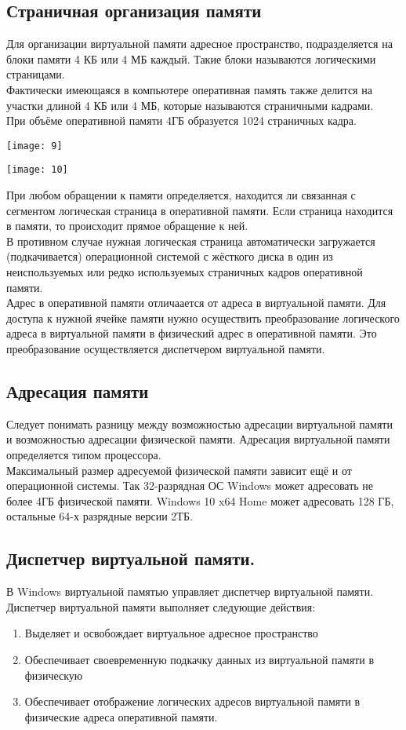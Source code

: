 \documentclass[a4paper]{article}
\begin{document}
\subsection{Страничная организация памяти}
Для организации виртуальной памяти адресное пространство, подразделяется на блоки памяти 4 КБ или 4 МБ каждый. Такие блоки называются логическими страницами.\\
Фактически имеющаяся в компьютере оперативная память также делится на участки длиной 4 КБ или 4 МБ, которые называются страничными кадрами.\\
При объёме оперативной памяти 4ГБ образуется 1024 страничных кадра.\\
\begin{center}
        \texttt{[image: 9]}
\end{center}
\begin{center}
        \texttt{[image: 10]}
\end{center}
При любом обращении к памяти определяется, находится ли связанная с сегментом логическая страница в оперативной памяти. Если страница находится в памяти, то происходит прямое обращение к ней.\\
В противном случае нужная логическая страница автоматически загружается (подкачивается) операционной системой с жёсткого диска в один из неиспользуемых или редко используемых страничных кадров оперативной памяти.\\
Адрес в оперативной памяти отличаается от адреса в виртуальной памяти. Для доступа к нужной ячейке памяти нужно осуществить преобразование логического адреса в виртуальной памяти в физический адрес в оперативной памяти. Это преобразование осуществляется диспетчером виртуальной памяти.\\
\subsection{Адресация памяти}
Следует понимать разницу между возможностью адресации виртуальной памяти и возможностью адресации физической памяти. Адресация виртуальной памяти определяется типом процессора.\\
Максимальный размер адресуемой физической памяти зависит ещё и от операционной системы. Так 32-разрядная ОС Windows может адресовать не более 4ГБ физической памяти. Windows 10 x64 Home может адресовать 128 ГБ, остальные 64-х разрядные версии 2ТБ.
\subsection{Диспетчер виртуальной памяти.}
В Windows виртуальной памятью управляет диспетчер виртуальной памяти. Диспетчер виртуальной памяти выполняет следующие действия:
\begin{enumerate}
	\item Выделяет и освобождает виртуальное адресное пространство
        \item Обеспечивает своевременную подкачку данных из виртуальной памяти в физическую
	\item Обеспечивает отображение логических адресов виртуальной памяти в физические адреса оперативной памяти.
\end{enumerate}
\end{document}
